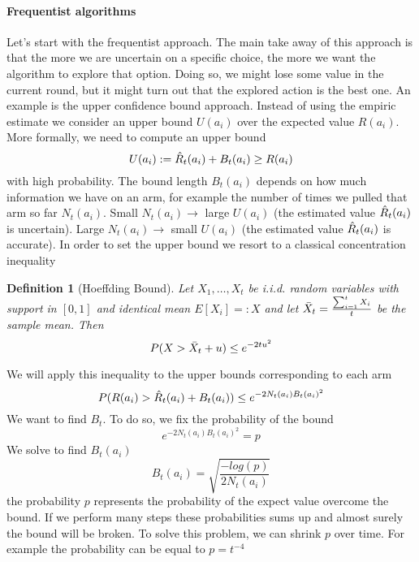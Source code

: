 \documentclass[main.tex]{subfiles}
\newtheorem{definition}{Definition}[section]
\begin{document}
\paragraph{Frequentist algorithms}
Let's start with the frequentist approach. The main take away of this approach is that the more we are uncertain on a specific choice, the more we want the algorithm to explore that option. Doing so, we might lose some value in the current round, but it might turn out that the explored action is the best one. An example is the upper confidence bound approach. Instead of using the empiric estimate we consider an upper bound $U(a_i)$
over the expected value $R(a_i)$. More formally, we need to compute an upper bound
\begin{equation*}
    U(a_i) := \Hat{R}_t(a_i) + B_t(a_i) \geq R(a_i)
\end{equation*}
with high probability. The bound length $B_t(a_i)$ depends on how much information we have on an arm, for example the number of times we pulled that arm so far $N_t(a_i)$.
Small $N_t(a_i) \rightarrow$ large $U(a_i)$ (the estimated value $\Hat{R}_t(a_i)$ is uncertain). Large $N_t(a_i) \rightarrow$ small $U(a_i)$ (the estimated value $\Hat{R}_t(a_i)$ is accurate).
In order to set the upper bound we resort to a classical concentration inequality
\begin{definition}[Hoeffding Bound]
Let $X_1,\dots,X_t$ be i.i.d. random variables with support in $[0, 1]$ and identical mean $E[X_i] =: X$ and let $\Bar{X}_t=\frac{\sum_{i=1}^t X_i}{t}$ be the sample mean. Then
\begin{equation*}
    P(X > \Bar{X}_t + u) \leq e^{-2tu^2}
\end{equation*}
\end{definition}
\par \noindent
We will apply this inequality to the upper bounds corresponding to each arm
\begin{equation}
    P(R(a_i) > \Hat{R}_t(a_i) + B_t(a_i)) \leq e^{-2N_t(a_i)B_t(a_i)^2}
\end{equation}
We want to find $B_t$. To do so, we fix the probability of the bound
\begin{equation*}
    e^{-2N_t(a_i)B_t(a_i)^2} = p
\end{equation*}
We solve to find $B_t(a_i)$
\begin{equation*}
    B_t(a_i) = \sqrt{\frac{-log(p)}{2N_t(a_i)}}
\end{equation*}
the probability $p$ represents the probability of the expect value overcome the bound. If we perform many steps these probabilities sums up and almost surely the bound will be broken. To solve this problem, we can shrink $p$ over time. For example the probability can be equal to $p=t^{-4}$
\end{document}
